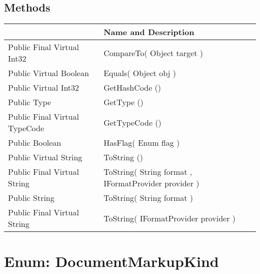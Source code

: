 \documentclass[11pt, oneside, a4paper]{book}
\begin{document}
\subsection{Methods}
\begin{center}
\begin{tabular}{| p{3cm} | p{12cm} | }
\hline
\textbf{ } & \textbf{ Name and Description}\\
\hline
 Public  Final  Virtual  Int32 &  CompareTo(\hypertarget{SoftwareEngineeringTools.{}Documentation.{}DocTextKind.{}CompareTo\_Object}{} Object  target  )\\
\hline
 Public  Virtual  Boolean &  Equals(\hypertarget{SoftwareEngineeringTools.{}Documentation.{}DocTextKind.{}Equals\_Object}{} Object  obj  )\\
\hline
 Public  Virtual  Int32 &  GetHashCode ()\hypertarget{SoftwareEngineeringTools.{}Documentation.{}DocTextKind.{}GetHashCode}{}\\
\hline
 Public  Type &  GetType ()\hypertarget{SoftwareEngineeringTools.{}Documentation.{}DocTextKind.{}GetType}{}\\
\hline
 Public  Final  Virtual  TypeCode &  GetTypeCode ()\hypertarget{SoftwareEngineeringTools.{}Documentation.{}DocTextKind.{}GetTypeCode}{}\\
\hline
 Public  Boolean &  HasFlag(\hypertarget{SoftwareEngineeringTools.{}Documentation.{}DocTextKind.{}HasFlag\_Enum}{} Enum  flag  )\\
\hline
 Public  Virtual  String &  ToString ()\hypertarget{SoftwareEngineeringTools.{}Documentation.{}DocTextKind.{}ToString}{}\\
\hline
 Public  Final  Virtual  String &  ToString(\hypertarget{SoftwareEngineeringTools.{}Documentation.{}DocTextKind.{}ToString\_String\_IFormatProvider}{} String  format  ,  IFormatProvider  provider  )\\
\hline
 Public  String &  ToString(\hypertarget{SoftwareEngineeringTools.{}Documentation.{}DocTextKind.{}ToString\_String}{} String  format  )\\
\hline
 Public  Final  Virtual  String &  ToString(\hypertarget{SoftwareEngineeringTools.{}Documentation.{}DocTextKind.{}ToString\_IFormatProvider}{} IFormatProvider  provider  )\\
\hline
\end{tabular}
\end{center}
 


\hypertarget{SoftwareEngineeringTools.{}Documentation.{}DocumentMarkupKind}{}
\section{Enum: DocumentMarkupKind}
\end{document}
